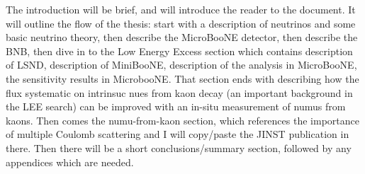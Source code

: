The introduction will be brief, and will introduce the reader to the document. It will outline the flow of the thesis: start with a description of neutrinos and some basic neutrino theory, then describe the MicroBooNE detector, then describe the BNB, then dive in to the Low Energy Excess section which contains description of LSND, description of MiniBooNE, description of the analysis in MicroBooNE, the sensitivity results in MicrobooNE. That section ends with describing how the flux systematic on intrinsuc nues from kaon decay (an important background in the LEE search) can be improved with an in-situ measurement of numus from kaons. Then comes the numu-from-kaon section, which references the importance of multiple Coulomb scattering and I will copy/paste the JINST publication in there. Then there will be a short conclusions/summary section, followed by any appendices which are needed.